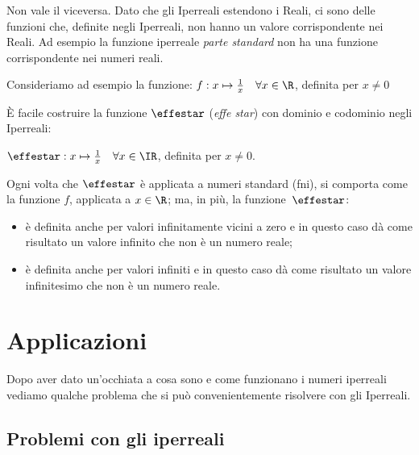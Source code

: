 \begin{osservazione}
 Non vale il viceversa. Dato che gli Iperreali estendono i Reali, ci sono 
delle funzioni che, definite negli Iperreali, non hanno un valore 
corrispondente nei Reali. Ad esempio la funzione iperreale \emph{parte 
standard} non ha una funzione corrispondente nei numeri reali.

\begin{esempio}
 Consideriamo ad esempio la funzione: 
\(f: x \mapsto \frac{1}{x} \quad \forall x \in \R\), definita per \(x\ne 0\)

È facile costruire la funzione \(\effestar\) (\emph{effe star}) con dominio e 
codominio negli Iperreali:

\(\effestar: x \mapsto \frac{1}{x} \quad \forall x \in \IR\), definita per 
\(x\ne 0\).

Ogni volta che \(\effestar\) è applicata a numeri standard (fni), si comporta 
come
la funzione \(f\), applicata a \(x \in \R\); ma, in più, la 
funzione~\(\effestar\):
\begin{itemize} [noitemsep]
 \item 
è definita anche per valori infinitamente vicini a zero e 
in questo caso dà come risultato un valore infinito che non è un numero 
reale;
 \item 
è definita anche per valori infiniti e
in questo caso dà come risultato un valore infinitesimo che non è un numero 
reale. 
\end{itemize}
\end{esempio}
\end{osservazione}

\section{Applicazioni}
\label{sec:insnum_applicazioni}

Dopo aver dato un'occhiata a cosa sono e come funzionano i numeri iperreali 
vediamo qualche problema che si può convenientemente risolvere con gli 
Iperreali.

\subsection{Problemi con gli iperreali}
\label{subsec:insnum_problemi}

